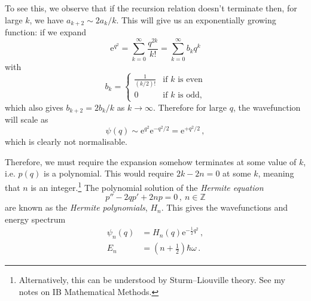 \documentclass{article}
\theoremstyle{plain}\theoremheaderfont{\normalfont\itshape}\theorembodyfont{\rmfamily}\theoremseparator{.}\newtheorem*{rem}{Remark}\newtheorem*{ex}{Example}\newtheorem*{proof}{Proof}\newtheorem*{altp}{Alternative proof}
\theoremstyle{plain}\theoremheaderfont{\normalfont\bfseries}\theorembodyfont{\rmfamily}\theoremseparator{.}\newtheorem{thm}{Theorem}[section]\newtheorem{lem}[thm]{Lemma}\newtheorem{prop}[thm]{Proposition}\newtheorem*{cor}{Corollary}\newtheorem{defn}[thm]{Definition}\newtheorem{clm}[thm]{Claim}\newtheorem{clminproof}{Claim}
\theoremstyle{break}\theoremheaderfont{\normalfont\itshape}\theorembodyfont{\rmfamily}\theoremseparator{.\medskip}\newtheorem*{proofskip}{Proof}\newtheorem*{exs}{Examples}\newtheorem*{rems}{Remarks}
\theoremstyle{break}\theoremheaderfont{\normalfont\bfseries}\theorembodyfont{\rmfamily}\theoremseparator{.\medskip}\newtheorem{lemskip}[thm]{Lemma}\newtheorem{defnskip}[thm]{Definition}\newtheorem{propskip}[thm]{Proposition}\newtheorem{thmskip}[thm]{Theorem}
\numberwithin{equation}{section}
\newcommand{\ee}{\mathrm{e}}
\begin{document}
    To see this, we observe that if the recursion relation doesn't terminate then, for large \(k\), we have \(a_{k+2}\sim 2a_k/k\). This will give us an exponentially growing function: if we expand
    \begin{equation}
        \ee^{q^2}=\sum_{k=0}^{\infty}\frac{q^{2k}}{k!}=\sum_{k=0}^{\infty}b_k q^k
    \end{equation}
    with
    \begin{equation}
        b_k=\begin{cases}
            \frac{1}{(k/2)!} & \text{if }k\text{ is even} \\
            0 & \text{if }k\text{ is odd,}
        \end{cases}
    \end{equation}
    which also gives \(b_{k+2}=2 b_k/k\) as \(k\to\infty\). Therefore for large \(q\), the wavefunction will scale as
    \begin{equation}
        \psi(q)\sim \ee^{q^2}\ee^{-q^2/2}=\ee^{+q^2/2}\,,
    \end{equation}
    which is clearly not normalisable.

    Therefore, we must require the expansion somehow terminates at some value of \(k\), i.e. \(p(q)\) is a polynomial. This would require \(2k-2n=0\) at some \(k\), meaning that \(n\) is an integer.\footnote{Alternatively, this can be understood by Sturm--Liouville theory. See my notes on IB Mathematical Methods.} The polynomial solution of the \textit{Hermite equation}
    \begin{equation}
        p''-2qp'+2np=0\,,\ n\in\mathbb{Z}
    \end{equation}
    are known as the \textit{Hermite polynomials}, \(H_n\). This gives the wavefunctions and energy spectrum
    \begin{align}
        \psi_n(q)&=H_n(q)\ee^{-\frac{1}{2}q^2}\,,\\
        E_n&=\left(n+\frac{1}{2}\right)\hbar\omega\,.
    \end{align}

    \newpage
\end{document}
